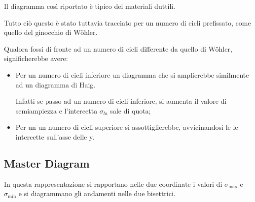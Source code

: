 			Il diagramma così riportato è tipico dei materiali duttili.
			
			Tutto ciò questo è stato tuttavia tracciato per un numero di cicli prefissato, come quello del ginocchio di Wöhler. 
			
			Qualora fossi di fronte ad un numero di cicli differente da quello di Wöhler, significherebbe avere:
				\begin{itemize}
				\item Per un numero di cicli inferiore un diagramma che si amplierebbe similmente ad un diagramma di Haig. 
				
				Infatti se passo ad un numero di cicli inferiore, si aumenta il valore di semiampiezza e l'intercetta $\sigma_{la}$ sale di quota;
				
				\item Per un un numero di cicli superiore si assottiglierebbe, avvicinandosi le le intercette sull'asse delle y. 
				
			\end{itemize} 
			

\subsection{Master Diagram	}					
			In questa rappresentazione si rapportano nelle due coordinate i valori di $\sigma_{\max}$ e $\sigma_{\min}$ e si diagrammano gli andamenti nelle due bisettrici. 
				
